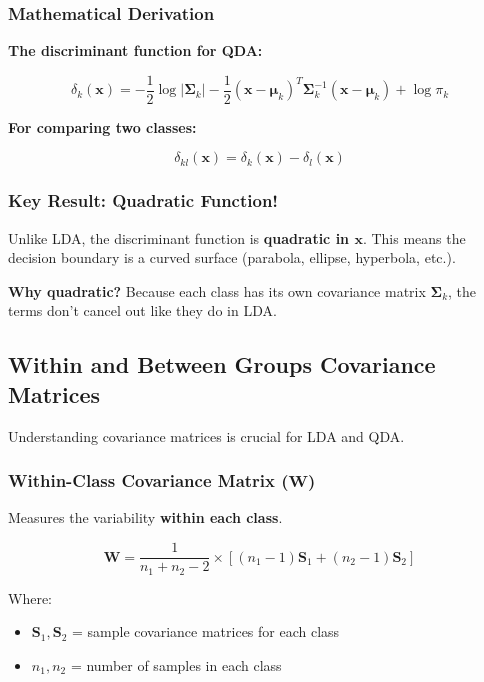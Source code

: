 \documentclass[12pt,a4paper]{article}
\begin{document}
\subsubsection{Mathematical Derivation}

\textbf{The discriminant function for QDA:}

\begin{equation}
\delta_k(\mathbf{x}) = -\frac{1}{2} \log|\boldsymbol{\Sigma}_k| - \frac{1}{2} (\mathbf{x}-\boldsymbol{\mu}_k)^T\boldsymbol{\Sigma}_k^{-1}(\mathbf{x}-\boldsymbol{\mu}_k) + \log \pi_k
\end{equation}

\textbf{For comparing two classes:}

\begin{equation}
\delta_{kl}(\mathbf{x}) = \delta_k(\mathbf{x}) - \delta_l(\mathbf{x})
\end{equation}

\subsubsection{Key Result: Quadratic Function!}

Unlike LDA, the discriminant function is \textbf{quadratic in $\mathbf{x}$}. This means the decision boundary is a curved surface (parabola, ellipse, hyperbola, etc.).

\textbf{Why quadratic?} Because each class has its own covariance matrix $\boldsymbol{\Sigma}_k$, the terms don't cancel out like they do in LDA.

\subsection{Within and Between Groups Covariance Matrices}

Understanding covariance matrices is crucial for LDA and QDA.

\subsubsection{Within-Class Covariance Matrix ($\mathbf{W}$)}

Measures the variability \textbf{within each class}.

\begin{equation}
\mathbf{W} = \frac{1}{n_1+n_2-2} \times [(n_1-1)\mathbf{S}_1 + (n_2-1)\mathbf{S}_2]
\end{equation}

Where:
\begin{itemize}
    \item $\mathbf{S}_1, \mathbf{S}_2$ = sample covariance matrices for each class
    \item $n_1, n_2$ = number of samples in each class
\end{itemize}
\end{document}
